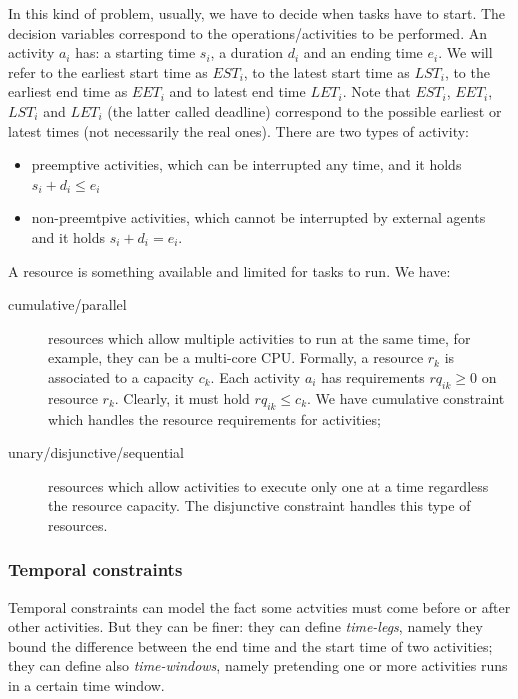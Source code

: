 \documentclass[10pt,a4paper]{article}
\begin{document}
In this kind of problem, usually, we have to decide when tasks have to start.
The decision variables correspond to the operations/activities to be performed.
An activity $a_i$ has: a starting time $s_i$, a duration $d_i$ and an ending
time $e_i$. We will refer to the earliest start time as $EST_i$, to the latest
start time as $LST_i$, to the earliest end time as $EET_i$ and to latest end
time $LET_i$. Note that $EST_i$, $EET_i$, $LST_i$ and $LET_i$ (the latter called
deadline) correspond to the possible earliest or latest times (not necessarily
the real ones). There are two types of activity:
\begin{itemize}
    \item preemptive activities, which can be interrupted any time, and it holds
    $s_i + d_i \leq e_i $
    \item non-preemtpive activities, which cannot be interrupted by external
    agents and it holds $s_i + d_i = e_i $.
\end{itemize}

A resource is something available and limited for tasks to run. We have:
\begin{description}
    \item[cumulative/parallel] resources which allow multiple activities to run
    at the same time, for example, they can be a multi-core CPU. Formally, a
    resource $r_k$ is associated to a capacity $c_k$. Each activity $a_i$ has
    requirements $rq_{ik} \geq 0$ on resource $r_k$. Clearly, it must hold
    $rq_{ik} \leq c_k$. We have cumulative constraint which handles the resource
    requirements for activities;
    \item[unary/disjunctive/sequential] resources which allow activities to
    execute only one at a time regardless the resource capacity. The disjunctive
    constraint handles this type of resources.
\end{description}

\subsubsection{Temporal constraints}
Temporal constraints can model the fact some actvities must come before or after
other activities. But they can be finer: they can define \textit{time-legs},
namely they bound the difference between the end time and the start time of two
activities; they can define also \textit{time-windows}, namely pretending one or
more activities runs in a certain time window.
\end{document}
